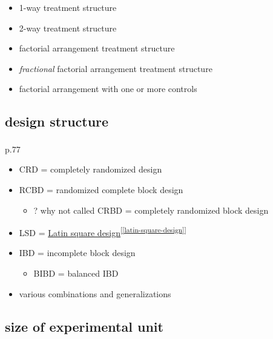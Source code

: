 \documentclass[
]{book}
\providecommand{\tightlist}{%
  \setlength{\itemsep}{0pt}\setlength{\parskip}{0pt}}
\theoremstyle{definition}
\theoremstyle{definition}
\theoremstyle{definition}
\theoremstyle{definition}
\theoremstyle{remark}
\begin{document}
\begin{itemize}
\tightlist
\item
  1-way treatment structure
\item
  2-way treatment structure
\item
  factorial arrangement treatment structure
\item
  \emph{fractional} factorial arrangement treatment structure
\item
  factorial arrangement with one or more controls
\end{itemize}

\subsection{design structure}\label{design-structure}

\textsuperscript{} p.77

\begin{itemize}
\tightlist
\item
  CRD = completely randomized design
\item
  RCBD = randomized complete block design

  \begin{itemize}
  \tightlist
  \item
    ? why not called CRBD = completely randomized block design
  \end{itemize}
\item
  LSD = \hyperref[latin-square-design]{Latin square design}\textsuperscript{{[}\ref{latin-square-design}{]}}
\item
  IBD = incomplete block design

  \begin{itemize}
  \tightlist
  \item
    BIBD = balanced IBD
  \end{itemize}
\item
  various combinations and generalizations
\end{itemize}

\subsection{size of experimental unit}\label{size-of-experimental-unit}
\end{document}
